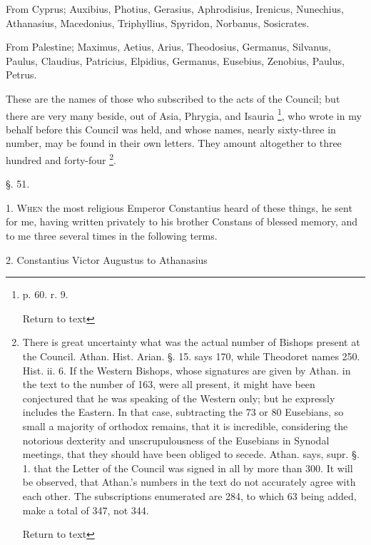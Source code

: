 From Cyprus; Auxibius, Photius, Gerasius,
Aphrodisius, Irenicus, Nunechius, Athanasius, Macedonius, Triphyllius,
Spyridon, Norbanus, Sosicrates.

From Palestine; Maximus, Aetius, Arius,
Theodosius, Germanus, Silvanus, Paulus, Claudius, Patricius, Elpidius,
Germanus, Eusebius, Zenobius, Paulus, Petrus.

These are the names of those who subscribed to
the acts of the Council; but there are very many beside, out of Asia,
Phrygia, and Isauria \footnote{p. 60. r. 9.

Return to text}, who wrote in my behalf before this
Council was held, and whose names, nearly sixty-three in number, may
be found in their own letters. They amount altogether to three hundred
and forty-four \footnote{There is great uncertainty what was the actual
number of Bishops present at the Council. Athan. Hist. Arian. §. 15.
says 170, while Theodoret names 250. Hist. ii. 6. If the Western
Bishops, whose signatures are given by Athan. in the text to the
number of 163, were all present, it might have been conjectured that
he was speaking of the Western only; but he expressly includes the
Eastern. In that case, subtracting the 73 or 80 Eusebians, so small a
majority of orthodox remains, that it is incredible, considering the
notorious dexterity and unscrupulousness of the Eusebians in Synodal
meetings, that they should have been obliged to secede. Athan. says,
supr. §. 1. that the Letter of the Council was signed in all by more
than 300. It will be observed, that Athan.'s numbers in the text do
not accurately agree with each other. The subscriptions enumerated are
284, to which 63 being added, make a total of 347, not 344.

Return to text

}.


§. 51.

1. W\textsc{hen} the most religious
Emperor Constantius heard of these things, he sent for me, having
written privately to his brother Constans of blessed memory, and to me
three several times in the following terms.

2. Constantius Victor Augustus to Athanasius

